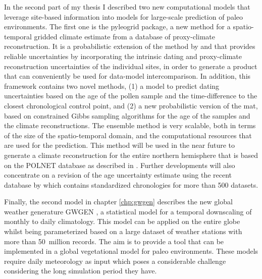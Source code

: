 \begin{refsection}
In the second part of my thesis I described two new computational models that leverage site-based information into models for large-scale prediction of paleo environments. The first one is the pyleogrid package, a new method for a spatio-temporal gridded climate estimate from a database of proxy-climate reconstruction. It is a probabilistic extension of the method by \cite{MauriDavisCollinsEtAl2015} and \cite{DavisBrewerStevensonEtAl2003} that provides reliable uncertainties by incorporating the intrinsic dating and proxy-climate reconstruction uncertainties of the individual sites, in order to generate a product that can conveniently be used for data-model intercomparison. In addition, this framework contains two novel methods, (1) a model to predict dating uncertainties based on the age of the pollen sample and the time-difference to the closest chronological control point, and (2) a new probabilistic version of the \gls{mat}, based on constrained Gibbs sampling algorithms for the age of the samples and the climate reconstructions. The ensemble method is very scalable, both in terms of the size of the spatio-temporal domain, and the computational resources that are used for the prediction. This method will be used in the near future to generate a climate reconstruction for the entire northern hemisphere that is based on the POLNET database as described in \cite{DavisKaplan2017}. Further developments will also concentrate on a revision of the age uncertainty estimate using the recent database by \cite{WangGoringMcGuire2019} which contains standardized chronologies for more than 500 datasets.

Finally, the second model in chapter \ref{chp:gwgen} describes the new global weather generature GWGEN \citep{SommerKaplan2017b}, a statistical model for a temporal downscaling of monthly to daily climatology. This model can be applied on the entire globe whilst being parameterized based on a large dataset of weather stations with more than 50~million records. The aim is to provide a tool that can be implemented in a global vegetational model for paleo environments. These models require daily meteorology as input which poses a considerable challenge considering the long simulation period they have.


\end{refsection}
